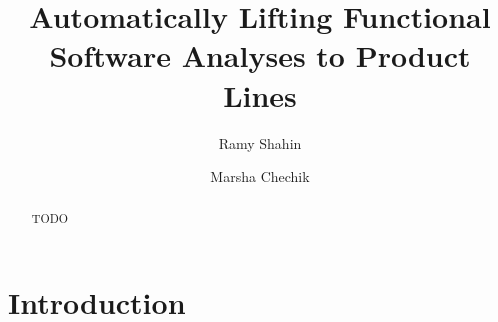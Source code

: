 \documentclass[10pt,conference]{llncs}
\begin{document}
%
\title{Automatically Lifting Functional Software Analyses to Product Lines}

\author{{Ramy Shahin} \and
	    {Marsha Chechik}}
	    



\maketitle

\begin{abstract}
TODO
\end{abstract}



\theoremstyle{definition}
\newtheorem{exmp}{Example}[section]

\newcommand{\tab}{\qquad}

\newcommand{\term}[1]		{\mathrm{#1}}
\newcommand{\var}[1]		{\mathrm{#1}}
\newcommand{\type}[1]		{\mathrm{#1}}
\newcommand{\kw}[1]		{\mathrm{#1}}
\newcommand{\ite}[3]		{\kw{if} \: #1 \: \kw{then} \: #2 \: \kw{else} \: #3}

\section{Introduction}

\end{document}
